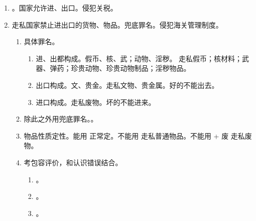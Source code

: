 \begin{enumerate}
\begin{enumerate}
          \item {}。国家允许进、出口。侵犯关税。
          \item 走私国家禁止进出口的货物、物品。兜底罪名。侵犯海关管理制度。
                \begin{enumerate}
                  \item 具体罪名。
                        \begin{enumerate}
                          \item 进、出都构成。假币、核、武；动物、淫秽。
                                走私假币；核材料；武器、弹药；珍贵动物、珍贵动物制品；淫秽物品。
                          \item 出口构成。文、贵金。走私文物、贵金属。好的不能出去。
                          \item 进口构成。走私废物。坏的不能进来。
                        \end{enumerate}
                  \item 除此之外用兜底罪名。。
                  \item 物品性质定性。能用 \yjt 正常定。不能用 \yjt 走私普通物品。不能用 + 废 \yjt 走私废物。
                  \item 考包容评价，和认识错误结合。
                        
                        \begin{enumerate}
                          \item {}。
                          \item {}。
                          \item {}。
                        \end{enumerate}
                \end{enumerate}
        \end{enumerate}
\end{enumerate}
